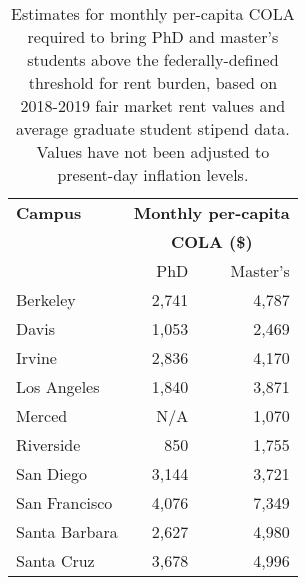 \documentclass{article}
\begin{document}
\begin{table}[ht]
\centering
\begin{tabular}{@{}lrr@{}}
\toprule
\textbf{Campus} & \multicolumn{2}{c}{\textbf{Monthly per-capita }} \\ 
	        & \multicolumn{2}{c}{\textbf{ COLA (\$)}} \\ \midrule
                & PhD                       & Master’s                      \\
Berkeley        & 2,741                      & 4,787                          \\
Davis           & 1,053                      & 2,469                          \\
Irvine          & 2,836                      & 4,170                          \\
Los Angeles     & 1,840                      & 3,871                          \\
Merced          & N/A                       & 1,070                           \\
Riverside       & 850                       & 1,755                          \\
San Diego       & 3,144                      & 3,721                          \\
San Francisco   & 4,076                      & 7,349                          \\
Santa Barbara   & 2,627                      & 4,980                          \\
Santa Cruz      & 3,678                      & 4,996                          \\ \bottomrule
\end{tabular}
\caption{Estimates for monthly per-capita COLA required to bring PhD and master's students above the federally-defined threshold for rent burden, based on 2018-2019 fair market rent values and average graduate student stipend data. Values have not been adjusted to present-day inflation levels.}
\label{colamon}
\end{table}
\end{document}
